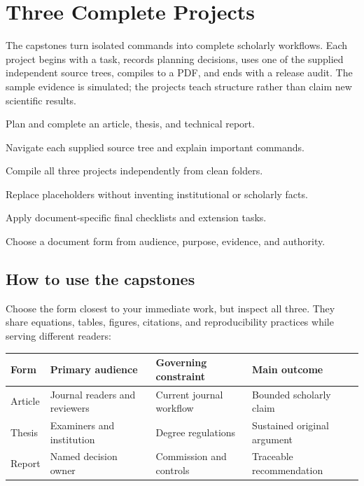 \chapter{Three Complete Projects}
\label{chap:capstones}

The capstones turn isolated commands into complete scholarly workflows. Each
project begins with a task, records planning decisions, uses one of the supplied
independent source trees, compiles to a PDF, and ends with a release audit. The
sample evidence is simulated; the projects teach structure rather than claim
new scientific results.

\begin{learningoutcomes}
  \item Plan and complete an article, thesis, and technical report.
  \item Navigate each supplied source tree and explain important commands.
  \item Compile all three projects independently from clean folders.
  \item Replace placeholders without inventing institutional or scholarly facts.
  \item Apply document-specific final checklists and extension tasks.
  \item Choose a document form from audience, purpose, evidence, and authority.
\end{learningoutcomes}

\section{How to use the capstones}

Choose the form closest to your immediate work, but inspect all three. They
share equations, tables, figures, citations, and reproducibility practices while
serving different readers:

\begin{center}
\begin{tabularx}{\textwidth}{@{}p{}XXX@{}}
  \toprule
  Form & Primary audience & Governing constraint & Main outcome \\
  \midrule
  Article & Journal readers and reviewers & Current journal workflow & Bounded scholarly claim \\
  Thesis & Examiners and institution & Degree regulations & Sustained original argument \\
  Report & Named decision owner & Commission and controls & Traceable recommendation \\
  \bottomrule
\end{tabularx}
\end{center}

